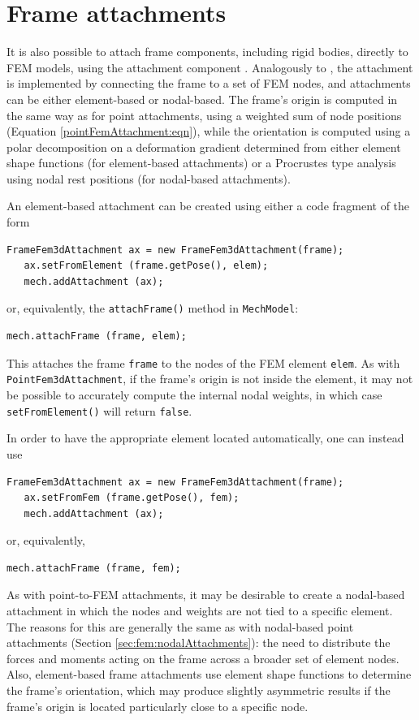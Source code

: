 
\section{Frame attachments}
\label{sec:fem:frameattachments}

It is also possible to attach frame components, including rigid
bodies, directly to FEM models, using the attachment component
.
Analogously to
, the
attachment is implemented by connecting the frame to a set of FEM
nodes, and attachments can be either element-based or nodal-based.  The
frame's origin is computed in the same way as for point attachments,
using a weighted sum of node positions (Equation
\ref{pointFemAttachment:eqn}), while the orientation is computed using
a polar decomposition on a deformation gradient determined from either
element shape functions (for element-based attachments) or a
Procrustes type analysis using nodal rest positions (for nodal-based attachments).

An element-based attachment can be created using either a code fragment
of the form
%
\begin{lstlisting}[]
   FrameFem3dAttachment ax = new FrameFem3dAttachment(frame);
   ax.setFromElement (frame.getPose(), elem);
   mech.addAttachment (ax);
\end{lstlisting}
%
or, equivalently, the {\tt attachFrame()} method in {\tt MechModel}:
%
\begin{lstlisting}[]
   mech.attachFrame (frame, elem);
\end{lstlisting}
%
This attaches the frame {\tt frame} to the nodes of the FEM element
{\tt elem}. As with {\tt PointFem3dAttachment}, if the frame's origin
is not inside the element, it may not be possible to accurately
compute the internal nodal weights, in which case {\tt
setFromElement()} will return {\tt false}.

In order to have the appropriate element located automatically,
one can instead use
%
\begin{lstlisting}[]
   FrameFem3dAttachment ax = new FrameFem3dAttachment(frame);
   ax.setFromFem (frame.getPose(), fem);
   mech.addAttachment (ax);
\end{lstlisting}
%
or, equivalently, 
%
\begin{lstlisting}[]
   mech.attachFrame (frame, fem);
\end{lstlisting}
%

As with point-to-FEM attachments, it may be desirable to create a
nodal-based attachment in which the nodes and weights are not tied to
a specific element. The reasons for this are generally the same as
with nodal-based point attachments (Section
\ref{sec:fem:nodalAttachments}): the need to distribute the forces and
moments acting on the frame across a broader set of element nodes.
Also, element-based frame attachments use element shape functions to
determine the frame's orientation, which may produce slightly
asymmetric results if the frame's origin is located particularly close
to a specific node.

